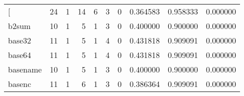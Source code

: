 \begin{longtable}{lrrrrrrrrr}
\bottomrule
\endlastfoot
{[}         &                                       24 &                                                  1 &                                                 14 &                                                  6 &                                                  3 &                                                  0 &                                           0.364583 &                               0.958333 &                             0.000000 \\
b2sum     &                                       10 &                                                  1 &                                                  5 &                                                  1 &                                                  3 &                                                  0 &                                           0.400000 &                               0.900000 &                             0.000000 \\
base32    &                                       11 &                                                  1 &                                                  5 &                                                  1 &                                                  4 &                                                  0 &                                           0.431818 &                               0.909091 &                             0.000000 \\
base64    &                                       11 &                                                  1 &                                                  5 &                                                  1 &                                                  4 &                                                  0 &                                           0.431818 &                               0.909091 &                             0.000000 \\
basename  &                                       10 &                                                  1 &                                                  5 &                                                  1 &                                                  3 &                                                  0 &                                           0.400000 &                               0.900000 &                             0.000000 \\
basenc    &                                       11 &                                                  1 &                                                  6 &                                                  1 &                                                  3 &                                                  0 &                                           0.386364 &                               0.909091 &                             0.000000 \\

\end{longtable}
